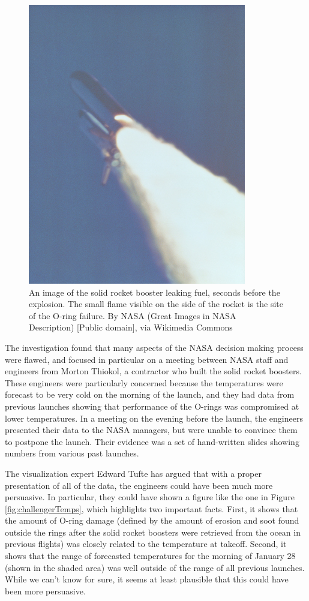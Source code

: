 \documentclass[12pt,]{book}
\theoremstyle{definition}
\theoremstyle{definition}
\theoremstyle{definition}
\theoremstyle{remark}
\begin{document}
\begin{figure}
\includegraphics[height=0.2\textheight]{images/Booster_Rocket_Breach_-_GPN-2000-001425} \caption{An image of the solid rocket booster leaking fuel, seconds before the explosion. The small flame visible on the side of the rocket is the site of the O-ring failure. By NASA (Great Images in NASA Description) [Public domain], via Wikimedia Commons}\label{fig:srbLeak}
\end{figure}

The investigation found that many aspects of the NASA decision making process were flawed, and focused in particular on a meeting between NASA staff and engineers from Morton Thiokol, a contractor who built the solid rocket boosters. These engineers were particularly concerned because the temperatures were forecast to be very cold on the morning of the launch, and they had data from previous launches showing that performance of the O-rings was compromised at lower temperatures. In a meeting on the evening before the launch, the engineers presented their data to the NASA managers, but were unable to convince them to postpone the launch. Their evidence was a set of hand-written slides showing numbers from various past launches.

The visualization expert Edward Tufte has argued that with a proper presentation of all of the data, the engineers could have been much more persuasive. In particular, they could have shown a figure like the one in Figure \ref{fig:challengerTemps}, which highlights two important facts. First, it shows that the amount of O-ring damage (defined by the amount of erosion and soot found outside the rings after the solid rocket boosters were retrieved from the ocean in previous flights) was closely related to the temperature at takeoff. Second, it shows that the range of forecasted temperatures for the morning of January 28 (shown in the shaded area) was well outside of the range of all previous launches. While we can't know for sure, it seems at least plausible that this could have been more persuasive.
\end{document}
